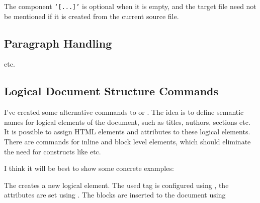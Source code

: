 The component \texttt{‘[...]’} is optional when it is empty, and the target file need not be mentioned if it is created from the current source file.


\texcommand{\LinkCommand}


\subsection{Paragraph Handling}
\label{sec:paragraph_handling}


\texcommand{\IgnorePar}
\texcommand{\EndP}
etc.

\subsection{Logical Document Structure Commands}
I've created some alternative commands to \texcommand{\HCode} or \texcommand{\Tg}. The idea is to define
semantic names for logical elements of the document, such as titles, authors,
sections etc. It is possible to assign HTML elements and attributes to these
logical elements. There are commands for inline and block level elements,
which should eliminate the need for constructs like \texcommand{\ifvmode\IgnorePar\fi\EndP}
etc.

I think it will be best to show some concrete examples:


\begin{texsource}



{\NoFonts{}}
{\EndNoFonts}

{}
{\NoFonts{}}
{\EndNoFonts}
\end{texsource}



The \texcommand{\NewLogicalBlock} creates a new logical element. The used tag is configured
using \texcommand{\SetTag}, the attributes are set using \texcommand{\SetBlockProperty}. The blocks are
inserted to the document using 

